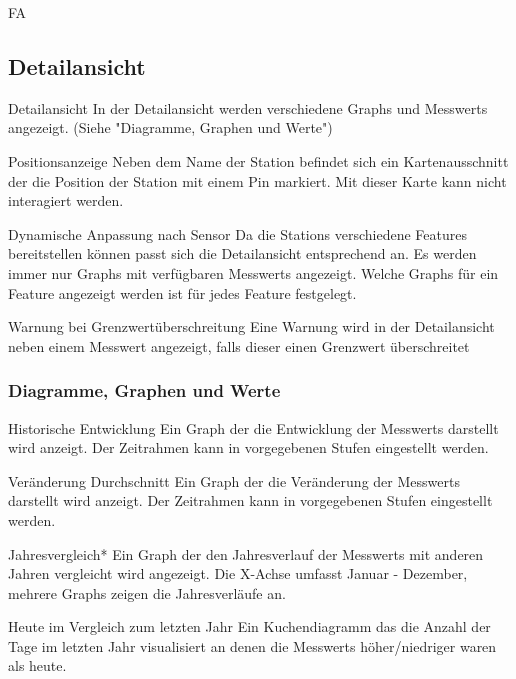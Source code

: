 \begin{Kriterien}{FA}
\subsection{Detailansicht}

 \item[Detailansicht]
   In der Detailansicht werden verschiedene \glspl{Graph} und \glspl{Messwert} angezeigt. 
   (Siehe "Diagramme, Graphen und Werte")
 \item[Positionsanzeige]
  Neben dem Name der \gls{Station} befindet sich ein Kartenausschnitt der die Position der \gls{Station} mit einem \gls{Pin} markiert.
  Mit dieser Karte kann nicht interagiert werden.

 \item[Dynamische Anpassung nach Sensor]
   Da die \glspl{Station} verschiedene \glspl{Feature} bereitstellen können passt sich die Detailansicht entsprechend an.
   Es werden immer nur \glspl{Graph} mit verfügbaren \glspl{Messwert} angezeigt.
   Welche \glspl{Graph} für ein \gls{Feature} angezeigt werden ist für jedes \gls{Feature} festgelegt.

 \item[Warnung bei Grenzwertüberschreitung]
  Eine Warnung wird in der Detailansicht neben einem \gls{Messwert} angezeigt, falls dieser einen Grenzwert überschreitet

 \subsubsection*{Diagramme, Graphen und Werte}

 \item[Historische Entwicklung]
   Ein \gls{Graph} der die Entwicklung der \glspl{Messwert} darstellt wird anzeigt.
   Der Zeitrahmen kann in vorgegebenen Stufen eingestellt werden.
 
 \item[Veränderung Durchschnitt]
   Ein Graph der die Veränderung der \glspl{Messwert} darstellt wird anzeigt.
   Der Zeitrahmen kann in vorgegebenen Stufen eingestellt werden.

 \item[Jahresvergleich*]
   Ein Graph der den Jahresverlauf der \glspl{Messwert} mit anderen Jahren vergleicht wird angezeigt.
   Die X-Achse umfasst Januar - Dezember, mehrere \glspl{Graph} zeigen die Jahresverläufe an.

 \item[Heute im Vergleich zum letzten Jahr]
   Ein \gls{Kuchendiagramm} das die Anzahl der Tage im letzten Jahr visualisiert an denen die \glspl{Messwert} höher/niedriger waren als heute.


\end{Kriterien}
